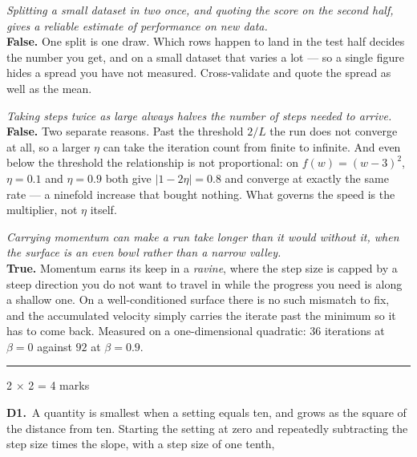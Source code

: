 \documentclass[10pt,a4paper]{article}
\newcommand{\parthead}[2]{\vspace{2pt}\noindent\rule{\linewidth}{0.4pt}\par\vspace{2pt}%
  \noindent{\bfseries Part #1}\hfill{\small #2}\par\vspace{1pt}}
\begin{document}
\begin{sC}

  \item \emph{Splitting a small dataset in two once, and quoting the score on the second half, gives a reliable estimate of performance on new data.}\\[2pt] \textbf{False.} One split is one draw. Which rows happen to land in the test half decides the number you get, and on a small dataset that varies a lot --- so a single figure hides a spread you have not measured. Cross-validate and quote the spread as well as the mean.

  \item \emph{Taking steps twice as large always halves the number of steps needed to arrive.}\\[2pt] \textbf{False.} Two separate reasons. Past the threshold $2/L$ the run does not converge at all, so a larger $\eta$ can take the iteration count from finite to infinite. And even below the threshold the relationship is not proportional: on $f(w) = (w-3)^2$, $\eta = 0.1$ and $\eta = 0.9$ both give $\lvert 1 - 2\eta \rvert = 0.8$ and converge at exactly the same rate --- a ninefold increase that bought nothing. What governs the speed is the multiplier, not $\eta$ itself.

  \item \emph{Carrying momentum can make a run take longer than it would without it, when the surface is an even bowl rather than a narrow valley.}\\[2pt] \textbf{True.} Momentum earns its keep in a \emph{ravine}, where the step size is capped by a steep direction you do not want to travel in while the progress you need is along a shallow one. On a well-conditioned surface there is no such mismatch to fix, and the accumulated velocity simply carries the iterate past the minimum so it has to come back. Measured on a one-dimensional quadratic: $36$ iterations at $\beta = 0$ against $92$ at $\beta = 0.9$.

\end{sC}

\newpage

\parthead{D --- Short answer}{2 $\times$ 2 = 4 marks}

\textbf{D1.}\ A quantity is smallest when a setting equals ten, and grows as the square of the distance from ten. Starting the setting at zero and repeatedly subtracting the step size times the slope, with a step size of one tenth,

\vspace{2pt}
\end{document}

